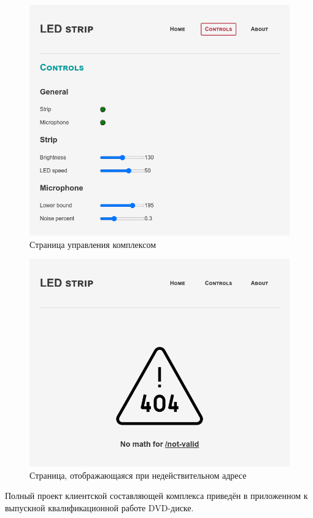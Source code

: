 \begin{figure}[H]
  \centering
  \includegraphics[height=0.4\textheight]{assets/images/practical/site__controls.png}
  \caption{Страница управления комплексом}
  \label{img:site__controls}
\end{figure}

\begin{figure}[H]
  \centering
  \includegraphics[height=0.4\textheight]{assets/images/practical/site__not-valid.png}
  \caption{Страница, отображающаяся при недействительном адресе}
  \label{img:site__not-valid}
\end{figure}

Полный проект клиентской составляющей комплекса приведён в приложенном к выпускной квалификационной работе DVD-диске.
